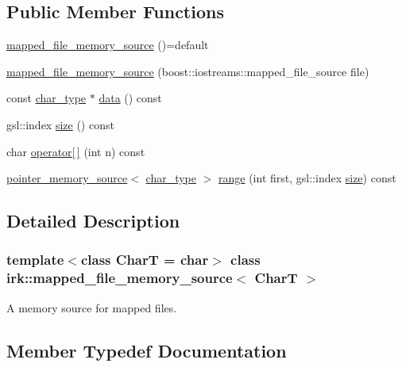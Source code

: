 \subsection*{Public Member Functions}
\begin{DoxyCompactItemize}
\item 
\mbox{\hyperlink{classirk_1_1mapped__file__memory__source_afda461084b8db2c179e990d8c8ab246c}{mapped\+\_\+file\+\_\+memory\+\_\+source}} ()=default
\item 
\mbox{\hyperlink{classirk_1_1mapped__file__memory__source_ab4171f0a22a8da5a55dde732c9c535c7}{mapped\+\_\+file\+\_\+memory\+\_\+source}} (boost\+::iostreams\+::mapped\+\_\+file\+\_\+source file)
\item 
const \mbox{\hyperlink{classirk_1_1mapped__file__memory__source_a9b4319787fae825c6a27be1e58447386}{char\+\_\+type}} $\ast$ \mbox{\hyperlink{classirk_1_1mapped__file__memory__source_aed12180cbed20420b7d783b5a9705eb3}{data}} () const
\item 
gsl\+::index \mbox{\hyperlink{classirk_1_1mapped__file__memory__source_a8b873edb44d37ff8fc89c80ff9c88482}{size}} () const
\item 
char \mbox{\hyperlink{classirk_1_1mapped__file__memory__source_a121d8c1899ac93d3dc215512ba3a5f1f}{operator\mbox{[}$\,$\mbox{]}}} (int n) const
\item 
\mbox{\hyperlink{classirk_1_1pointer__memory__source}{pointer\+\_\+memory\+\_\+source}}$<$ \mbox{\hyperlink{classirk_1_1mapped__file__memory__source_a9b4319787fae825c6a27be1e58447386}{char\+\_\+type}} $>$ \mbox{\hyperlink{classirk_1_1mapped__file__memory__source_a4f437093075267ae96a512877b8c4b11}{range}} (int first, gsl\+::index \mbox{\hyperlink{classirk_1_1mapped__file__memory__source_a8b873edb44d37ff8fc89c80ff9c88482}{size}}) const
\end{DoxyCompactItemize}


\subsection{Detailed Description}
\subsubsection*{template$<$class CharT = char$>$\newline
class irk\+::mapped\+\_\+file\+\_\+memory\+\_\+source$<$ Char\+T $>$}

A memory source for mapped files. 

\subsection{Member Typedef Documentation}
\mbox{\label{classirk_1_1mapped__file__memory__source_a9b4319787fae825c6a27be1e58447386}} 
